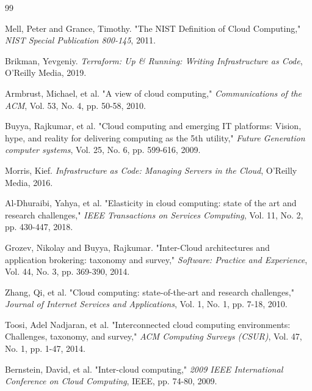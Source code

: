 
\begin{thebibliography}{99}

     Mell, Peter and Grance, Timothy. "The NIST Definition of Cloud Computing," \textit{NIST Special Publication 800-145}, 2011.

     Brikman, Yevgeniy. \textit{Terraform: Up \& Running: Writing Infrastructure as Code}, O'Reilly Media, 2019.

     Armbrust, Michael, et al. "A view of cloud computing," \textit{Communications of the ACM}, Vol. 53, No. 4, pp. 50-58, 2010.

     Buyya, Rajkumar, et al. "Cloud computing and emerging IT platforms: Vision, hype, and reality for delivering computing as the 5th utility," \textit{Future Generation computer systems}, Vol. 25, No. 6, pp. 599-616, 2009.

     Morris, Kief. \textit{Infrastructure as Code: Managing Servers in the Cloud}, O'Reilly Media, 2016.

     Al-Dhuraibi, Yahya, et al. "Elasticity in cloud computing: state of the art and research challenges," \textit{IEEE Transactions on Services Computing}, Vol. 11, No. 2, pp. 430-447, 2018.

     Grozev, Nikolay and Buyya, Rajkumar. "Inter-Cloud architectures and application brokering: taxonomy and survey," \textit{Software: Practice and Experience}, Vol. 44, No. 3, pp. 369-390, 2014.

     Zhang, Qi, et al. "Cloud computing: state-of-the-art and research challenges," \textit{Journal of Internet Services and Applications}, Vol. 1, No. 1, pp. 7-18, 2010.

     Toosi, Adel Nadjaran, et al. "Interconnected cloud computing environments: Challenges, taxonomy, and survey," \textit{ACM Computing Surveys (CSUR)}, Vol. 47, No. 1, pp. 1-47, 2014.

     Bernstein, David, et al. "Inter-cloud computing," \textit{2009 IEEE International Conference on Cloud Computing}, IEEE, pp. 74-80, 2009.


\end{thebibliography}
